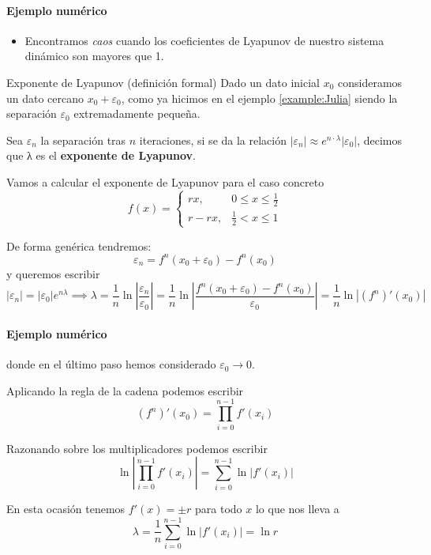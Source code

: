 \documentclass[8pt]{beamer}
\begin{document}
\begin{frame}
\framesubtitle{Ejemplo numérico}

\begin{itemize}
\item Encontramos \emph{caos} cuando los coeficientes de Lyapunov de nuestro sistema dinámico son mayores que 1.
\end{itemize}

\begin{block}{Exponente de Lyapunov (definición formal)}
Dado un dato inicial $x_0$ consideramos un dato cercano $x_0+ε_0$, como ya hicimos en el ejemplo \ref{example:Julia} siendo la separación $ε_0$ extremadamente pequeña.

Sea $ε_n$ la separación tras $n$ iteraciones, si se da la relación $|ε_n|\approx e^{n\cdot λ}|ε_0|$, decimos que λ es el \textbf{exponente de Lyapunov}.
\end{block}

\begin{example}
Vamos a calcular el exponente de Lyapunov para el caso concreto
\[f(x) = \left\{ \begin{array}{ll}
rx, & 0 \leq x \leq \frac{1}{2}\\
r-rx, & \frac{1}{2} < x \leq 1
\end{array}\right.\]

De forma genérica tendremos:
\[ε_n = f^n(x_0+ε_0)-f^n(x_0) \]
y queremos escribir
\[|ε_n| = |ε_0| e^{nλ} \implies λ = \frac{1}{n} \ln\left| \frac{ε_n}{ε_0}\right| = \frac{1}{n}\ln \left|\frac{f^n(x_0+ε_0)-f^n(x_0)}{ε_0} \right| = \frac{1}{n}\ln \left|(f^n)'(x_0) \right|\]
\end{example}
\end{frame}

\begin{frame}
\framesubtitle{Ejemplo numérico}
\begin{example}[Continuación]
donde en el último paso hemos considerado $ε_0 \to 0$.

Aplicando la regla de la cadena podemos escribir
\[(f^n)'(x_0) = \prod_{i=0}^{n-1}f'(x_i) \]

Razonando sobre los multiplicadores podemos escribir
\[\ln \left|\prod_{i=0}^{n-1}f'(x_i)\right| = \sum_{i=0}^{n-1}\ln |f'(x_i)| \]

En esta ocasión tenemos $f'(x)=\pm r$ para todo $x$ lo que nos lleva a
\[λ= \frac{1}{n}\sum_{i=0}^{n-1}\ln |f'(x_i)| = \ln r\]
\end{example}
\end{frame}
\end{document}
